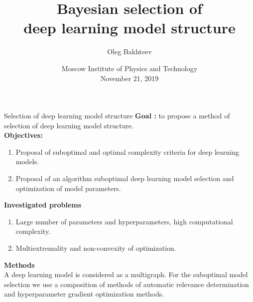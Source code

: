 \documentclass[usenames,dvipsnames,11pt,pdf,utf8,russian,aspectratio=43]{beamer}
\title[Model structure selection]{Bayesian selection of \\deep learning model structure}
\author{Oleg Bakhteev}
\institute[]{Supervisor: Prof. Vadim Strijov\\}
\date[2019]{Moscow Institute of Physics and Technology\\November 21, 2019}
\begin{document}

\begin{frame}
  \titlepage
\end{frame}



\begin{frame}{Selection of deep learning model structure}
\small
\textbf{Goal :} to propose a method of selection of deep learning model structure.\\
\textbf{Objectives:}
\begin{enumerate}
\item Proposal of suboptimal and optimal complexity criteria for deep learning models.
\item Proposal of an algorithm suboptimal deep learning model selection and optimization of model parameters.
\end{enumerate}
\textbf{Investigated problems}
\begin{enumerate}
\item Large number of parameters and hyperparameters, high computational complexity.
\item Multiextremality and non-convexity of optimization.
\end{enumerate}
\textbf{Methods}\\
A deep learning model is considered as a multigraph. For the suboptimal model selection we use a composition of methods of automatic relevance determination and hyperparameter gradient optimization methods.
\end{frame}
\end{document}
